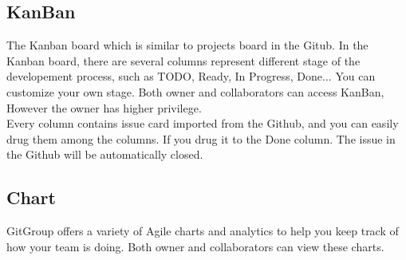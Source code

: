 \documentclass[12pt,a4paper]{report}
\begin{document}
\subsection{KanBan}
The Kanban board which is similar to projects board in the Gitub. In the Kanban board, there are several columns represent different stage of the developement process, such as TODO, Ready, In Progress, Done... You can customize your own stage. Both owner and collaborators can access KanBan, However the owner has higher privilege.\\
Every column contains issue card imported from the Github, and you can easily drug them among the columns. If you drug it to the Done column. The issue in the Github will be automatically closed.
\subsection{Chart}
GitGroup offers a variety of Agile charts and analytics to help you keep track of how your team is doing. Both owner and collaborators can view these charts.
\end{document}
